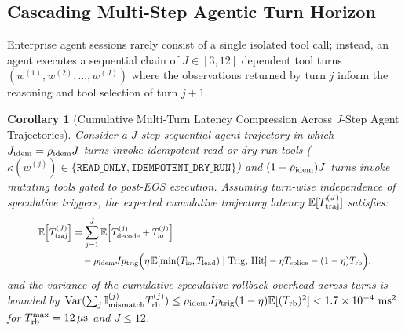 \documentclass[10pt,conference]{IEEEtran}
\newtheorem{corollary}{Corollary}
\begin{document}
\subsection{Cascading Multi-Step Agentic Turn Horizon}
Enterprise agent sessions rarely consist of a single isolated tool call; instead, an agent executes a sequential chain of $J \in [3, 12]$ dependent tool turns $(w^{(1)}, w^{(2)}, \dots, w^{(J)})$ where the observations returned by turn $j$ inform the reasoning and tool selection of turn $j+1$.

\begin{corollary}[Cumulative Multi-Turn Latency Compression Across $J$-Step Agent Trajectories]
\label{cor:multiturn}
Consider a $J$-step sequential agent trajectory in which $J_{\textnormal{idem}} = \rho_{\textnormal{idem}} J$ turns invoke idempotent read or dry-run tools ($\kappa(w^{(j)}) \in \{\texttt{READ\_ONLY}, \texttt{IDEMPOTENT\_DRY\_RUN}\}$) and $(1 - \rho_{\textnormal{idem}}) J$ turns invoke mutating tools gated to post-EOS execution. Assuming turn-wise independence of speculative triggers, the expected cumulative trajectory latency $\mathbb{E}[T_{\textnormal{traj}}^{(J)}]$ satisfies:
\begin{equation}
\resizebox{0.88\columnwidth}{!}{$\displaystyle
\begin{aligned}
\mathbb{E}\!\left[T_{\textnormal{traj}}^{(J)}\right] &= \sum_{j=1}^J \mathbb{E}\!\left[T_{\textnormal{decode}}^{(j)} + T_{\textnormal{io}}^{(j)}\right] \\
&\quad - \rho_{\textnormal{idem}} J p_{\textnormal{trig}} \Big(\eta\,\mathbb{E}\!\left[\min(T_{\textnormal{io}}, T_{\textnormal{lead}}) \;\middle|\; \textnormal{Trig, Hit}\right] - \eta T_{\textnormal{splice}} - (1 - \eta) T_{\textnormal{rb}}\Big),
\end{aligned}
$}
\label{eq:multiturn_saving}
\end{equation}
and the variance of the cumulative speculative rollback overhead across turns is bounded by $\operatorname{Var}(\sum_{j} \mathbb{I}_{\textnormal{mismatch}}^{(j)} T_{\textnormal{rb}}^{(j)}) \le \rho_{\textnormal{idem}} J p_{\textnormal{trig}}(1-\eta) \mathbb{E}[(T_{\textnormal{rb}})^2] < 1.7 \times 10^{-4}\text{ ms}^2$ for $T_{\textnormal{rb}}^{\max} = 12\,\mu\text{s}$ and $J \le 12$.
\end{corollary}
\end{document}
